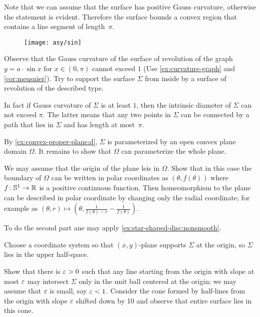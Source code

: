 Note that we can assume that the surface has positive Gauss curvature, otherwise the statement is evident.
Therefore the surface bounds a convex region that contains a line segment of length~$\pi$.

\begin{figure}[h!]
\vskip-0mm
\centering
\texttt{[image: asy/sin]}
\vskip-0mm
\end{figure}

Observe that the Gauss curvature of the surface of revolution of the graph $y=a\cdot \sin x$ for $x\in(0,\pi)$ cannot exceed $1$ (Use \ref{ex:curvature-graph} and \ref{cor:meusnier}).
Try to support the surface $\Sigma$ from inside by a surface of revolution of the described type. 

In fact if Gauss curvature of $\Sigma$ is at least $1$,
then
the intrinsic diameter of $\Sigma$ can not exceed $\pi$.
The latter means that any two points in $\Sigma$ can be connected by a path that lies in $\Sigma$ and has length at most~$\pi$.



By \ref{ex:convex-proper-plane:d}, $\Sigma$ is parameterized by an open convex plane domain $\Omega$.
It remains to show that $\Omega$ can parameterize the whole plane.

We may assume that the origin of the plane leis in $\Omega$.
Show that in this case the boundary of $\Omega$ can be written in polar coordinates as $(\theta,f(\theta))$ where $f\colon\mathbb{S}^1\to\mathbb{R}$ is a positive continuous function.
Then homeomorphism to the plane can be described in polar coordinate by changing only the radial coordinate;
for example as 
$(\theta,r)\mapsto (\theta,
\tfrac1{f(\theta)-r}-\tfrac1{f(\theta)})$.

To do the second part ane may apply \ref{ex:star-shaped-disc:nonsmooth}.


Choose a coordinate system so that $(x,y)$-plane supports $\Sigma$ at the origin, so $\Sigma$ lies in the upper half-space.

Show that there is $\varepsilon>0$ such that any line starting from the origin with slope at most $\varepsilon$ may intersect $\Sigma$ only in the unit ball centered at the origin;
we may assume that $\varepsilon$ is small, say $\varepsilon<1$.
Consider the cone formed by half-lines from the origin with slope $\varepsilon$ shifted down by 10 and observe that entire surface lies in this cone.



